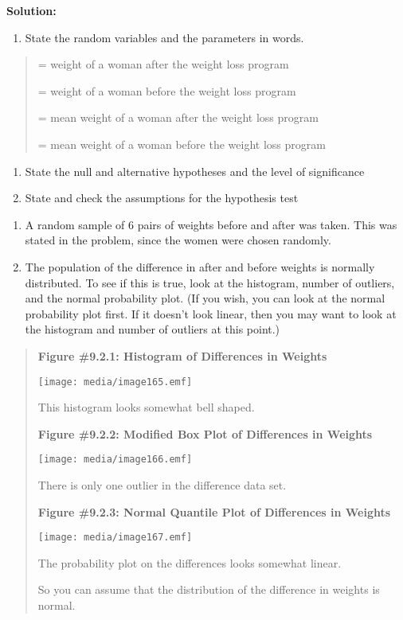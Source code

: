 \documentclass[]{book}
\providecommand{\tightlist}{%
  \setlength{\itemsep}{0pt}\setlength{\parskip}{0pt}}
\begin{document}
\textbf{Solution:}

\begin{enumerate}
\def\labelenumi{\arabic{enumi}.}
\tightlist
\item
  State the random variables and the parameters in words.
\end{enumerate}

\begin{quote}
= weight of a woman after the weight loss program

= weight of a woman before the weight loss program

= mean weight of a woman after the weight loss program

= mean weight of a woman before the weight loss program
\end{quote}

\begin{enumerate}
\def\labelenumi{\arabic{enumi}.}
\setcounter{enumi}{1}
\item
  State the null and alternative hypotheses and the level of significance
\item
  State and check the assumptions for the hypothesis test
\end{enumerate}

\begin{enumerate}
\def\labelenumi{\alph{enumi}.}
\item
  A random sample of 6 pairs of weights before and after was taken. This was stated in the problem, since the women were chosen randomly.
\item
  The population of the difference in after and before weights is normally distributed. To see if this is true, look at the histogram, number of outliers, and the normal probability plot. (If you wish, you can look at the normal probability plot first. If it doesn't look linear, then you may want to look at the histogram and number of outliers at this point.)
\end{enumerate}

\begin{quote}
\textbf{Figure \#9.2.1: Histogram of Differences in Weights}

\texttt{[image: media/image165.emf]}

This histogram looks somewhat bell shaped.

\textbf{Figure \#9.2.2: Modified Box Plot of Differences in Weights}

\texttt{[image: media/image166.emf]}

There is only one outlier in the difference data set.

\textbf{Figure \#9.2.3: Normal Quantile Plot of Differences in Weights}

\texttt{[image: media/image167.emf]}

The probability plot on the differences looks somewhat linear.

So you can assume that the distribution of the difference in weights is normal.
\end{quote}
\end{document}
